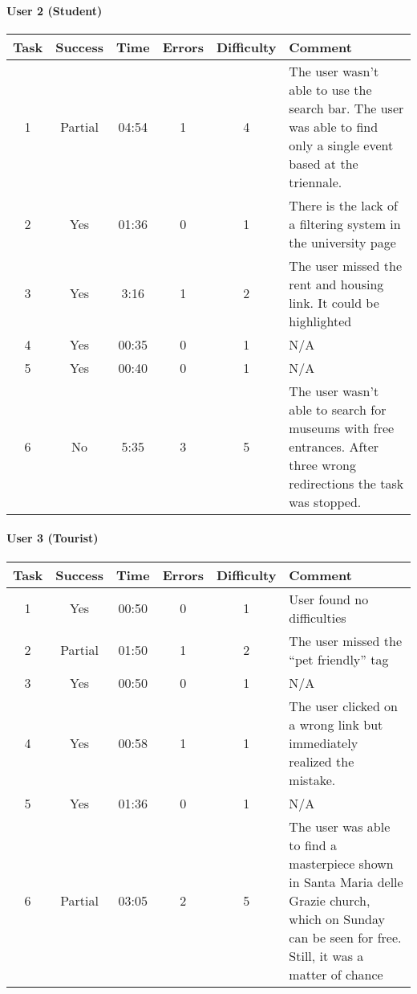 \begin{small}
\paragraph{User 2 (Student)}
\begin{tabularx}{\linewidth}{c c c c c X}
    \toprule
    \textbf{Task} & \textbf{Success} & \textbf{Time}
     & \textbf{Errors} & \textbf{Difficulty} & \textbf{Comment} \\
    \midrule
    1 & Partial & 04:54 & 1 & 4 & The user wasn't able to use the search bar. The user was able to find only a single event based at the triennale. \\ \midrule
    2 & Yes & 01:36 & 0 & 1 & There is the lack of a filtering system in the university page \\ \midrule
    3 & Yes & 3:16 & 1 & 2 & The user missed the rent and housing link. It could be highlighted \\ \midrule
    4 & Yes & 00:35 & 0 & 1 & N/A \\ \midrule
    5 & Yes & 00:40 & 0 & 1 & N/A \\ \midrule
    6 & No & 5:35 & 3 & 5 & The user wasn't able to search for museums with free entrances. After three wrong redirections the task was stopped. \\ \bottomrule
\end{tabularx}

\paragraph{User 3 (Tourist)}
\begin{tabularx}{\linewidth}{c c c c c X}
    \toprule
    \textbf{Task} & \textbf{Success} & \textbf{Time}
     & \textbf{Errors} & \textbf{Difficulty} & \textbf{Comment} \\
    \midrule
    1 & Yes & 00:50 & 0 & 1 & User found no difficulties \\ \midrule
    2 & Partial & 01:50 & 1 & 2 & The user missed the ``pet friendly'' tag \\ \midrule
    3 & Yes & 00:50 & 0 & 1 & N/A \\ \midrule
    4 & Yes & 00:58 & 1 & 1 & The user clicked on a wrong link but immediately realized the mistake. \\ \midrule
    5 & Yes & 01:36 & 0 & 1 & N/A \\ \midrule
    6 & Partial & 03:05 & 2 & 5 & The user was able to find a masterpiece shown in Santa Maria delle Grazie church, which on Sunday can be seen for free. Still, it was a matter of chance \\ \bottomrule
\end{tabularx}


\end{small}
